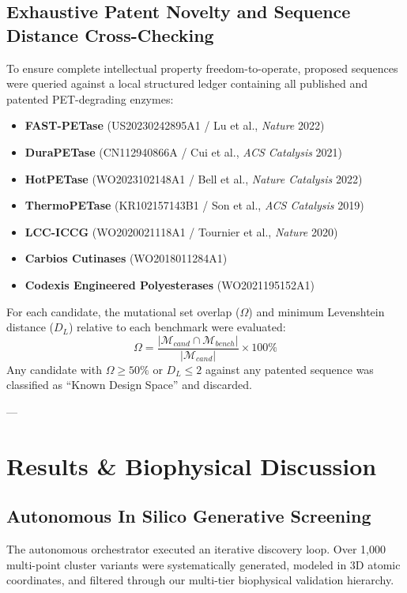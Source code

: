 \documentclass[10pt,twocolumn,a4paper]{article}
\begin{document}
\subsection{Exhaustive Patent Novelty and Sequence Distance Cross-Checking}
To ensure complete intellectual property freedom-to-operate, proposed sequences were queried against a local structured ledger containing all published and patented PET-degrading enzymes:
\begin{itemize}
    \item \textbf{FAST-PETase} (US20230242895A1 / Lu et al., \textit{Nature} 2022)~\cite{Lu2022}
    \item \textbf{DuraPETase} (CN112940866A / Cui et al., \textit{ACS Catalysis} 2021)~\cite{Cui2021}
    \item \textbf{HotPETase} (WO2023102148A1 / Bell et al., \textit{Nature Catalysis} 2022)~\cite{Bell2022}
    \item \textbf{ThermoPETase} (KR102157143B1 / Son et al., \textit{ACS Catalysis} 2019)~\cite{Son2019}
    \item \textbf{LCC-ICCG} (WO2020021118A1 / Tournier et al., \textit{Nature} 2020)~\cite{Tournier2020}
    \item \textbf{Carbios Cutinases} (WO2018011284A1)~\cite{Tournier2020}
    \item \textbf{Codexis Engineered Polyesterases} (WO2021195152A1)
\end{itemize}
For each candidate, the mutational set overlap ($\Omega$) and minimum Levenshtein distance ($D_L$) relative to each benchmark were evaluated:
\begin{equation}
\Omega = \frac{|\mathcal{M}_{cand} \cap \mathcal{M}_{bench}|}{|\mathcal{M}_{cand}|} \times 100\%
\end{equation}
Any candidate with $\Omega \ge 50\%$ or $D_L \le 2$ against any patented sequence was classified as ``Known Design Space'' and discarded.

---

\section{Results \& Biophysical Discussion}

\subsection{Autonomous In Silico Generative Screening}
The autonomous orchestrator executed an iterative discovery loop. Over 1,000 multi-point cluster variants were systematically generated, modeled in 3D atomic coordinates, and filtered through our multi-tier biophysical validation hierarchy.
\end{document}
